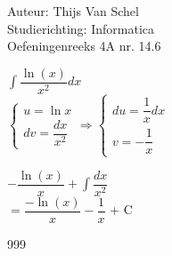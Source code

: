\documentclass[a4paper]{article}
\begin{document}
  
\noindent \large Auteur: Thijs Van Schel \\
\noindent \large Studierichting: Informatica\\
\noindent \large Oefeningenreeks 4A nr. 14.6\\

\medskip

\normalsize

$\displaystyle\int\dfrac{\ln(x)}{x^2}dx$ \\

$\left\{
	\begin{array}{l}
		u = \ln x\\
		dv = \dfrac{dx}{x^2}
	\end{array}
\right.
\Rightarrow
\left\{
	\begin{array}{l}
		du = \dfrac{1}{x}dx\\
		v = -\dfrac{1}{x}
	\end{array}
\right.$

$-\dfrac{\ln(x)}{x} + \displaystyle\int\dfrac{dx}{x^2}$\\

$= \dfrac{-\ln(x)}{x}-\dfrac{1}{x}$ + C\\

\begin{thebibliography}{999}
\end{thebibliography}
\end{document}
